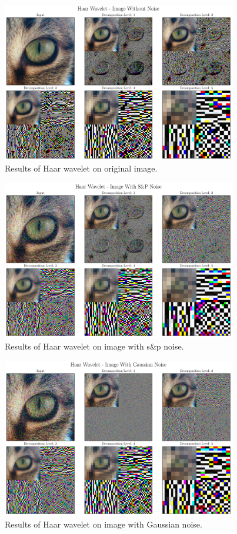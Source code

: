 \documentclass[12pt]{article}
\begin{document}
	\begin{figure}[!h]
		\centering
		\includegraphics[height=7cm]{../Tests/Outputs/2D_HaarWavelet_WithoutNoise.pdf}
		\caption{Results of Haar wavelet on original image.}
		\label{fig:2d_haar}
	\end{figure}

	\begin{figure}[!h]
		\centering
		\includegraphics[height=7cm]{../Tests/Outputs/2D_HaarWavelet_SPNoise.pdf}
		\caption{Results of Haar wavelet on image with s\&p noise.}
		\label{fig:2d_haar_sp}
	\end{figure}
	
	\begin{figure}[!h]
		\centering
		\includegraphics[height=7cm]{../Tests/Outputs/2D_HaarWavelet_GaussianNoise.pdf}
		\caption{Results of Haar wavelet on image with Gaussian noise.}
		\label{fig:2d_haar_gs}
	\end{figure}
	
\end{document}
